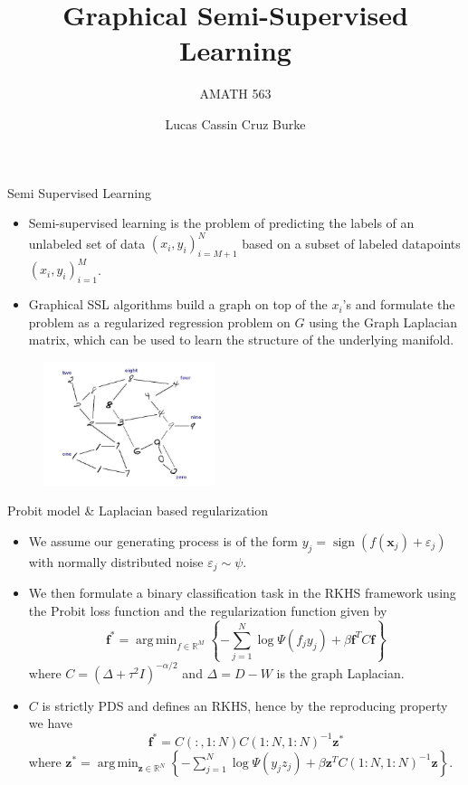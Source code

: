 \documentclass[9pt]{beamer}
\title[University of Washington]{Graphical Semi-Supervised Learning}
\subtitle{AMATH 563}
\author[]{Lucas Cassin Cruz Burke}
\DeclareMathOperator*{\argmin}{arg\,min}
\begin{document}
\frame{\titlepage}

\begin{frame}{Semi Supervised Learning}
    \begin{itemize}
        \item Semi-supervised learning is the problem of predicting the labels of an unlabeled set of data $(x_i, y_i)_{i=M+1}^N$ based on a subset of labeled datapoints $(x_i, y_i)_{i=1}^M$. 
        \item Graphical SSL algorithms build a graph on top of the $x_i$'s and formulate the problem as a regularized regression problem on $G$ using the Graph Laplacian matrix, which can be used to learn the structure of the underlying manifold.
    \end{itemize}
    \begin{figure}[h!]
      \centering
      \includegraphics[width=5cm]{digitSSL_ex.png} %
    \end{figure}
\end{frame}


\begin{frame}{Probit model \& Laplacian based regularization}
    \begin{itemize}
      \item We assume our generating process is of the form $y_j = \operatorname{sign} (f(\mathbf x_j) + \varepsilon_j)$ with normally distributed noise $\varepsilon_j \sim \psi$.
      \item We then formulate a binary classification task in the RKHS framework using the Probit loss function and the regularization function given by
      $$\mathbf f^* = \argmin_{f \in \mathbb R^M} \left\{ - \sum_{j=1}^N \log \Psi (f_j y_j) + \beta \mathbf f^T C \mathbf f \right\}$$where $C = \left( \Delta + \tau^2 I \right)^{-\alpha/2}$ and $\Delta = D - W$ is the graph Laplacian.
      \item $C$ is strictly PDS and defines an RKHS, hence by the reproducing property we have $$\mathbf f^* = C(:, 1:N)C(1:N, 1:N)^{-1}\mathbf z^*$$ where $\mathbf z^* = \argmin_{\mathbf z \in \mathbb R^N} \left\{-\sum_{j=1}^N \log \Psi (y_j z_j) + \beta \mathbf z^T C(1:N, 1:N)^{-1} \mathbf z \right\}$.
    \end{itemize}
  
\end{frame}
\end{document}

